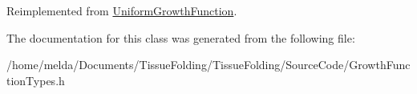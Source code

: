 Reimplemented from \hyperlink{classUniformGrowthFunction_a227ffb3a524779628f98f110d3811399}{Uniform\+Growth\+Function}.



The documentation for this class was generated from the following file\+:\begin{DoxyCompactItemize}
\item 
/home/melda/\+Documents/\+Tissue\+Folding/\+Tissue\+Folding/\+Source\+Code/Growth\+Function\+Types.\+h\end{DoxyCompactItemize}
